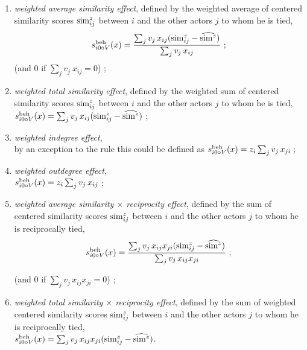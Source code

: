 \documentclass[a4paper,12pt,fleqn]{article}
\newcommand{\vit}{\theenumi}
\begin{document}
\begin{enumerate}
\addtocounter{enumi}{2}
 \item {\em weighted average similarity effect}, defined by the
 weighted average of centered similarity scores ${\rm sim}^z_{ij}$ between $i$
 and the other actors $j$ to whom he is tied,\\
 \[
 s^{\rm beh}_{i\vit \circ V}(x) =
   \frac{\sum_j v_j\, x_{ij} ({\rm sim}^z_{ij} - \widehat{{\rm sim}^z})}{\sum_j v_j \,x_{ij}} \ ;
   \]
 (and 0 if $\sum_j v_j\ x_{ij} = 0$)  ;

 \item {\em weighted total similarity effect}, defined by the
 weighted sum of centered similarity scores ${\rm sim}^z_{ij}$ between $i$
 and the other actors $j$ to whom he is tied,\\
 $s^{\rm beh}_{i\vit \circ V}(x) = \sum_j v_j\, x_{ij} ({\rm sim}^z_{ij} - \widehat{{\rm sim}^z}) $ ;

 \item {\em weighted indegree effect}, \\
 by an exception to the rule this could be defined as
 $s^{\rm beh}_{i\vit \circ V}(x) = z_i \sum_j v_j\,x_{ji}\,$;

 \item {\em weighted outdegree effect}, \\
 $s^{\rm beh}_{i\vit \circ V}(x) = z_i \sum_j v_j \,x_{ij} $ ;

\addtocounter{enumi}{1}

 \item
 {\em weighted average similarity $\times$ reciprocity effect}, defined by the
 sum of centered similarity scores ${\rm sim}^z_{ij}$ between $i$
 and the other actors $j$ to whom he is reciprocally tied,
 \[
 s^{\rm beh}_{i\vit \circ V}(x) =
 \frac{ \sum_j v_j \, x_{ij} x_{ji} ({\rm sim}^z_{ij} - \widehat{{\rm sim}^z})}
     {\sum_j v_j \, x_{ij} x_{ji}} \ ;
\]

 (and 0 if $\sum_j v_j \, x_{ij} x_{ji} = 0$) ;

 \item {\em weighted total similarity $\times$ reciprocity effect}, defined by the
 sum of weighted centered similarity scores ${\rm sim}^z_{ij}$ between $i$
 and the other actors $j$ to whom he is reciprocally tied,\\
 $s^{\rm beh}_{i\vit \circ V}(x) =  \sum_j v_j\, x_{ij} x_{ji} ({\rm sim}^z_{ij} -
                                \widehat{{\rm sim}^z}) $.

\medskip


\end{enumerate}
\end{document}

